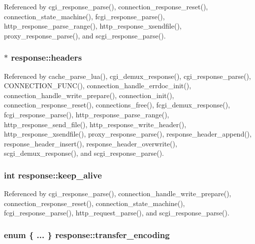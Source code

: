 Referenced by cgi\-\_\-response\-\_\-parse(), connection\-\_\-response\-\_\-reset(), connection\-\_\-state\-\_\-machine(), fcgi\-\_\-response\-\_\-parse(), http\-\_\-response\-\_\-parse\-\_\-range(), http\-\_\-response\-\_\-xsendfile(), proxy\-\_\-response\-\_\-parse(), and scgi\-\_\-response\-\_\-parse().

\hypertarget{structresponse_acdd8b44049b5d416df88a1503deffc40}{
\subsubsection[{headers}]{$\ast$ response\-::headers}}\label{structresponse_acdd8b44049b5d416df88a1503deffc40}


Referenced by cache\-\_\-parse\-\_\-lua(), cgi\-\_\-demux\-\_\-response(), cgi\-\_\-response\-\_\-parse(), C\-O\-N\-N\-E\-C\-T\-I\-O\-N\-\_\-\-F\-U\-N\-C(), connection\-\_\-handle\-\_\-errdoc\-\_\-init(), connection\-\_\-handle\-\_\-write\-\_\-prepare(), connection\-\_\-init(), connection\-\_\-response\-\_\-reset(), connections\-\_\-free(), fcgi\-\_\-demux\-\_\-response(), fcgi\-\_\-response\-\_\-parse(), http\-\_\-response\-\_\-parse\-\_\-range(), http\-\_\-response\-\_\-send\-\_\-file(), http\-\_\-response\-\_\-write\-\_\-header(), http\-\_\-response\-\_\-xsendfile(), proxy\-\_\-response\-\_\-parse(), response\-\_\-header\-\_\-append(), response\-\_\-header\-\_\-insert(), response\-\_\-header\-\_\-overwrite(), scgi\-\_\-demux\-\_\-response(), and scgi\-\_\-response\-\_\-parse().

\hypertarget{structresponse_af13edeff2f67025a2edbdd9d48d2b6df}{
\subsubsection[{keep\-\_\-alive}]{\setlength{\rightskip}{0pt plus 5cm}int response\-::keep\-\_\-alive}}\label{structresponse_af13edeff2f67025a2edbdd9d48d2b6df}


Referenced by cgi\-\_\-response\-\_\-parse(), connection\-\_\-handle\-\_\-write\-\_\-prepare(), connection\-\_\-response\-\_\-reset(), connection\-\_\-state\-\_\-machine(), fcgi\-\_\-response\-\_\-parse(), http\-\_\-request\-\_\-parse(), and scgi\-\_\-response\-\_\-parse().

\hypertarget{structresponse_adcf8491ba3102f920d8bcb8666374d01}{
\subsubsection[{transfer\-\_\-encoding}]{\setlength{\rightskip}{0pt plus 5cm}enum \{ ... \}   response\-::transfer\-\_\-encoding}}\label{structresponse_adcf8491ba3102f920d8bcb8666374d01}



